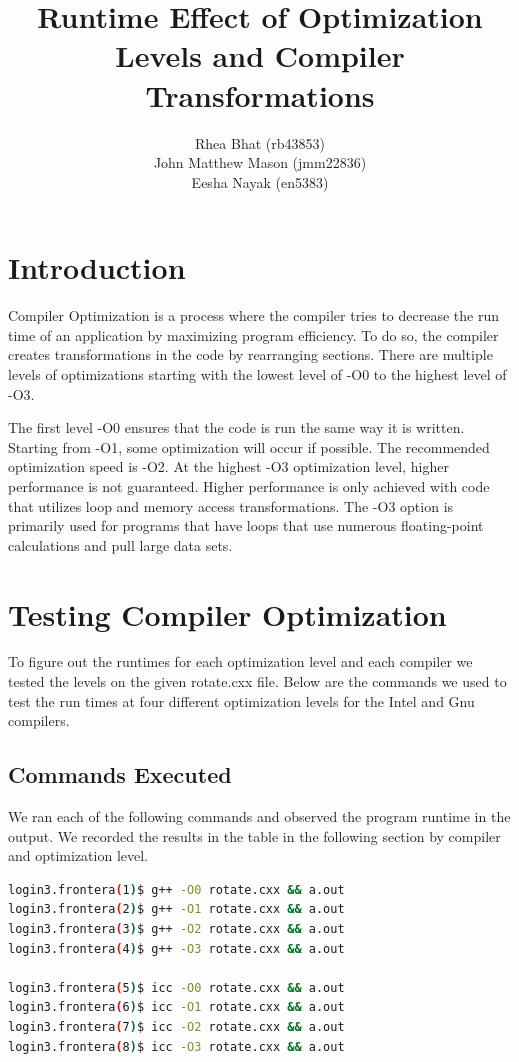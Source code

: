 \documentclass{report}
\begin{document}
\title{Runtime Effect of Optimization Levels and Compiler Transformations}
\author{Rhea Bhat (rb43853) \\ John Matthew Mason (jmm22836) \\ Eesha Nayak (en5383)}
\maketitle

\section*{Introduction}
Compiler Optimization is a process where the compiler tries to decrease the run time of an application by maximizing program efficiency. To do so, the compiler creates transformations in the code by rearranging sections. There are multiple levels of optimizations starting with the lowest level of -O0 to the highest level of -O3. 

The first level -O0 ensures that the code is run the same way it is written. Starting from -O1, some optimization will occur if possible. The recommended optimization speed is -O2. At the highest -O3 optimization level, higher performance is not guaranteed. Higher performance is only achieved with code that utilizes loop and memory access transformations. The -O3 option is primarily used for programs that have loops that use numerous floating-point calculations and pull large data sets.

\section*{Testing Compiler Optimization}
To figure out the runtimes for each optimization level and each compiler we tested the levels on the given rotate.cxx file. Below are the commands we used to test the run times at four different optimization levels for the Intel and Gnu compilers.

\subsection*{Commands Executed}

We ran each of the following commands and observed the program runtime in the output.  We recorded the results in the table in the following section by compiler and optimization level.

\begin{lstlisting}[language=bash]
login3.frontera(1)$ g++ -O0 rotate.cxx && a.out
login3.frontera(2)$ g++ -O1 rotate.cxx && a.out
login3.frontera(3)$ g++ -O2 rotate.cxx && a.out
login3.frontera(4)$ g++ -O3 rotate.cxx && a.out

login3.frontera(5)$ icc -O0 rotate.cxx && a.out
login3.frontera(6)$ icc -O1 rotate.cxx && a.out
login3.frontera(7)$ icc -O2 rotate.cxx && a.out
login3.frontera(8)$ icc -O3 rotate.cxx && a.out
\end{lstlisting}
\end{document}
